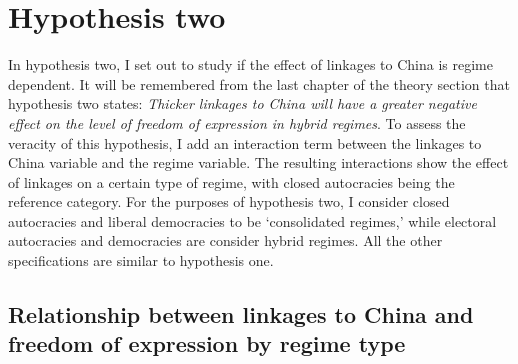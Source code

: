 \section{Hypothesis two} \label{sec:h2}
In hypothesis two, I set out to study if the effect of linkages to China is regime dependent. It will be remembered from the last chapter of the theory section that hypothesis two states: \textit{Thicker linkages to China will have a greater negative effect on the level of freedom of expression in hybrid regimes}. To assess the veracity of this hypothesis, I add an interaction term between the linkages to China variable and the regime variable. The resulting interactions show the effect of linkages on a certain type of regime, with closed autocracies being the reference category. For the purposes of hypothesis two, I consider closed autocracies and liberal democracies to be `consolidated regimes,' while electoral autocracies and democracies are consider hybrid regimes. All the other specifications are similar to hypothesis one. 

\subsection{Relationship between linkages to China and freedom of expression by regime type}

